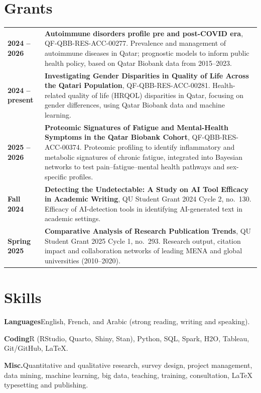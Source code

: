 \documentclass[10pt,a4paper]{article}
\makeatletter
\newenvironment{cvdated}{%
  \begin{longtable}{@{}>{\raggedleft\arraybackslash\bfseries}p{3.35cm}@{\hspace{0.35cm}}p{\dimexpr\textwidth-3.7cm\relax}@{}}}%
  {\end{longtable}\vspace{-10pt}}
\newcommand{\cvrow}[2]{#1 & #2 \\[3pt]}
\makeatother
\begin{document}
\section{Grants}
\begin{cvdated}
\cvrow{2024 -- 2026}{\textbf{Autoimmune disorders profile pre and post-COVID era}, QF-QBB-RES-ACC-00277.\newline
Prevalence and management of autoimmune diseases in Qatar; prognostic models to inform public health policy, based on Qatar Biobank data from 2015--2023.}
\cvrow{2024 -- present}{\textbf{Investigating Gender Disparities in Quality of Life Across the Qatari Population}, QF-QBB-RES-ACC-00281.\newline
Health-related quality of life (HRQOL) disparities in Qatar, focusing on gender differences, using Qatar Biobank data and machine learning.}
\cvrow{2025 -- 2026}{\textbf{Proteomic Signatures of Fatigue and Mental-Health Symptoms in the Qatar Biobank Cohort}, QF-QBB-RES-ACC-00374.\newline
Proteomic profiling to identify inflammatory and metabolic signatures of chronic fatigue, integrated into Bayesian
networks to test pain--fatigue--mental health pathways and sex-specific profiles.}
\cvrow{Fall 2024}{\textbf{Detecting the Undetectable: A Study on AI Tool Efficacy in Academic Writing}, QU Student Grant 2024 Cycle 2, no.~130.\newline
Efficacy of AI-detection tools in identifying AI-generated text in academic settings.}
\cvrow{Spring 2025}{\textbf{Comparative Analysis of Research Publication Trends}, QU Student Grant 2025 Cycle 1, no.~293.\newline
Research output, citation impact and collaboration networks of leading MENA and global universities (2010--2020).}
\end{cvdated}

\section{Skills}
\textbf{Languages}\enspace English, French, and Arabic (strong reading, writing and speaking).\par
\textbf{Coding}\enspace R (RStudio, Quarto, Shiny, Stan), Python, SQL, Spark, H2O, Tableau, Git/GitHub, \LaTeX.\par
\textbf{Misc.}\enspace Quantitative and qualitative research, survey design, project management, data mining,
machine learning, big data, teaching, training, consultation, \LaTeX{} typesetting and publishing.
\end{document}
